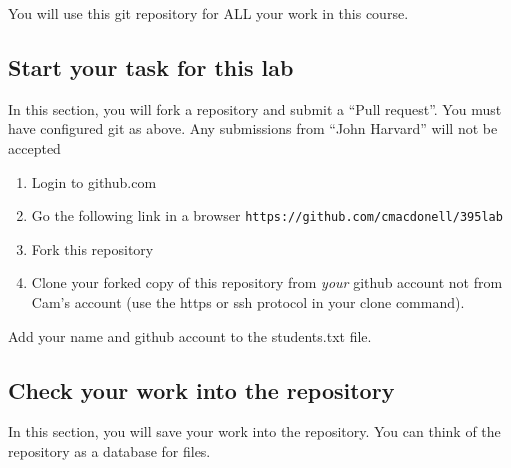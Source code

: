 \documentclass[letterpaper]{article}
\begin{document}
You will use this git repository for ALL your work in this course.

\subsection*{Start your task for this lab}

In this section, you will fork a repository and submit a ``Pull request''.  You must have configured git as above.  Any submissions from ``John Harvard'' will not be accepted

\begin{enumerate}
\item Login to github.com
\item Go the following link in a browser \verb+https://github.com/cmacdonell/395lab+
\item Fork this repository
\item Clone your forked copy of this repository from {\it your} github account not from Cam's account (use the https or ssh protocol in your clone command).
\end{enumerate}

Add your name and github account to the students.txt file.

\subsection*{Check your work into the repository}

In this section, you will save your work into the repository.
You can think of the repository as a database for files.
\end{document}
